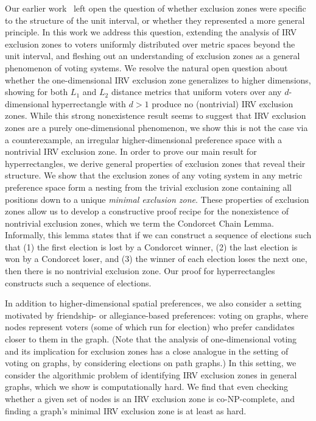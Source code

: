 \documentclass{article}
\theoremstyle{theorem}
\theoremstyle{definition}
\begin{document}
Our earlier work~\cite{tomlinson2024moderating} left open the question of whether exclusion zones were specific to the structure of the unit interval, or whether they represented a more general principle.  In this work we address this question, extending the analysis of IRV exclusion zones to voters uniformly distributed over metric spaces beyond the unit interval, and fleshing out an understanding of exclusion zones as a general phenomenon of voting systems. We resolve the natural open question about whether the one-dimensional IRV exclusion zone generalizes to higher dimensions, showing for both $L_1$ and $L_2$ distance metrics that uniform voters over any $d$-dimensional hyperrectangle with $d >1$ produce no (nontrivial) IRV exclusion zones. While this strong nonexistence result seems to suggest that IRV exclusion zones are a purely one-dimensional phenomenon, we show this is not the case via a counterexample, an irregular higher-dimensional preference space with a nontrivial IRV exclusion zone. In order to prove our main result for hyperrectangles, we derive general properties of exclusion zones that reveal their structure. We show that the exclusion zones of any voting system in any metric preference space form a nesting from the trivial exclusion zone containing all positions down to a unique \emph{minimal exclusion zone}. These properties of exclusion zones allow us to develop a constructive proof recipe for the nonexistence of nontrivial exclusion zones, which we term the Condorcet Chain Lemma. Informally, this lemma states that if we can construct a sequence of elections such that (1) the first election is lost by a Condorcet winner, (2) the last election is won by a Condorcet loser, and (3) the winner of each election loses the next one, then there is no nontrivial exclusion zone. Our proof for hyperrectangles constructs such a sequence of elections.

In addition to higher-dimensional spatial preferences, we also consider a setting motivated by friendship- or allegiance-based preferences: voting on graphs, where nodes represent voters (some of which run for election) who prefer candidates closer to them in the graph. (Note that the analysis of one-dimensional voting and its implication for exclusion zones has a close analogue in the setting of voting on graphs, by considering elections on path graphs.)  In this setting, we consider the algorithmic problem of identifying IRV exclusion zones in general graphs, which we show is computationally hard. We find that even checking whether a given set of nodes is an IRV exclusion zone is co-NP-complete, and finding a graph's minimal IRV exclusion zone is at least as hard. 
\end{document}
